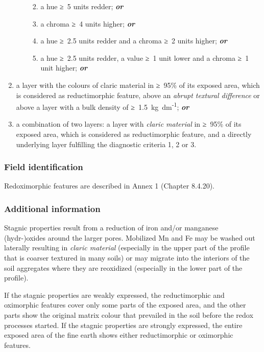 \documentclass[
  letterpaper,
  DIV=11,
  numbers=noendperiod]{scrreprt}
\providecommand{\tightlist}{%
  \setlength{\itemsep}{0pt}\setlength{\parskip}{0pt}}\usepackage{longtable,booktabs,array}
\begin{document}
\begin{enumerate}
\begin{enumerate}
    \begin{enumerate}
    \def\labelenumiii{\roman{enumiii}.}
    \tightlist
    \item
      a hue ≥~5 units redder; \textbf{\emph{or}}
    \item
      a chroma ≥~4 units higher; \textbf{\emph{or}}
    \item
      a hue ≥~2.5 units redder and a chroma ≥~2 units higher;
      \textbf{\emph{or}}
    \item
      a hue ≥~2.5 units redder, a value ≥~1 unit lower and a chroma ≥~1
      unit higher; \textbf{\emph{or}}
    \end{enumerate}
  \end{enumerate}
\item
  a layer with the colours of claric material in ≥~95\% of its exposed
  area, which is considered as reductimorphic feature, above an
  \emph{abrupt textural difference} or above a layer with a bulk density
  of ≥~1.5~kg~dm\textsuperscript{-1}; \textbf{\emph{or}}
\item
  a combination of two layers: a layer with \emph{claric material} in
  ≥~95\% of its exposed area, which is considered as reductimorphic
  feature, and a directly underlying layer fulfilling the diagnostic
  criteria 1, 2 or 3.
\end{enumerate}

\hypertarget{field-identification-37}{%
\subsubsection{Field identification}\label{field-identification-37}}

Redoximorphic features are described in Annex 1 (Chapter 8.4.20).

\hypertarget{additional-information-28}{%
\subsubsection{Additional information}\label{additional-information-28}}

Stagnic properties result from a reduction of iron and/or manganese
(hydr-)oxides around the larger pores. Mobilized Mn and Fe may be washed
out laterally resulting in \emph{claric material} (especially in the
upper part of the profile that is coarser textured in many soils) or may
migrate into the interiors of the soil aggregates where they are
reoxidized (especially in the lower part of the profile).

If the stagnic properties are weakly expressed, the reductimorphic and
oximorphic features cover only some parts of the exposed area, and the
other parts show the original matrix colour that prevailed in the soil
before the redox processes started. If the stagnic properties are
strongly expressed, the entire exposed area of the fine earth shows
either reductimorphic or oximorphic features.
\end{document}
